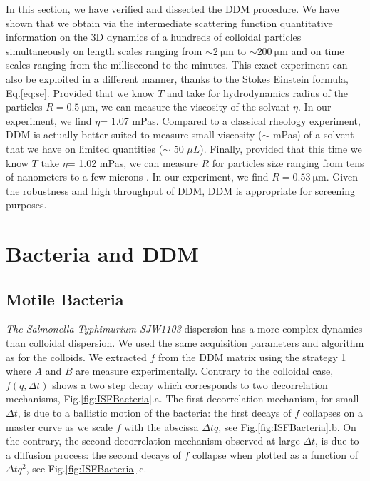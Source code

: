 \documentclass[prb,twocolumn,amsmath,amssymb]{revtex4-1}
\newcommand{\tgn}[1]{{\color{blue}#1}} %
\begin{document}
In this section, we have verified and dissected the DDM procedure. We have shown that we obtain via the intermediate scattering function quantitative information on the 3D dynamics of a hundreds of colloidal particles simultaneously on length scales ranging from $\sim \SI{2}{\micro\meter}$ to $\sim \SI{200}{\micro\meter}$ and on time scales ranging from the millisecond to the minutes. This exact experiment can also be exploited in a different manner, thanks to the Stokes Einstein formula, Eq.\eqref{eq:se}. Provided  that we know $T$ and take for hydrodynamics radius of the particles $R= \SI{0.5}{\micro\meter}$, we can measure the viscosity of the solvant $\eta$. In our experiment, we find \tgn{$\eta$= 1.07 mPas}. Compared to a classical rheology experiment, DDM is actually better suited to measure small viscosity ($\sim$ mPas) of a solvent that we have on limited quantities ($\sim$ 50 $\mu L$). Finally, provided that this time we know $T$ take  $\eta$= 1.02 mPas, we can measure $R$ for particles size ranging from tens of nanometers to a few microns \cite{2_DDM}.  In our experiment, we find $R= \SI{0.53}{\micro\meter}$. Given the robustness and high throughput of DDM, DDM is appropriate for screening purposes.

\section{Bacteria and DDM}
\label{sec:BactSection}

\subsection{Motile Bacteria}

\textit{The Salmonella Typhimurium SJW1103} dispersion has a more complex dynamics than colloidal dispersion. We used the same acquisition parameters and algorithm as for the colloids. We extracted $f$ from the DDM matrix using the strategy 1 where $A$ and $B$ are measure experimentally. Contrary to the colloidal case, $f(q, \Delta t)$ shows a two step decay which corresponds to two decorrelation mechanisms, Fig.\ref{fig:ISFBacteria}.a. The first decorrelation mechanism, for small $\Delta t$, is due to a ballistic motion of the bacteria: \tgn{the first decays of $f$ collapses on a master curve} as we scale $f$ with the abscissa  $\Delta t q$, see Fig.\ref{fig:ISFBacteria}.b. On the contrary, the second decorrelation mechanism observed at large $\Delta t$, is due to a diffusion process:  \tgn{the second decays of $f$} collapse when plotted as a function of $\Delta t q^2$, see Fig.\ref{fig:ISFBacteria}.c.
\end{document}
